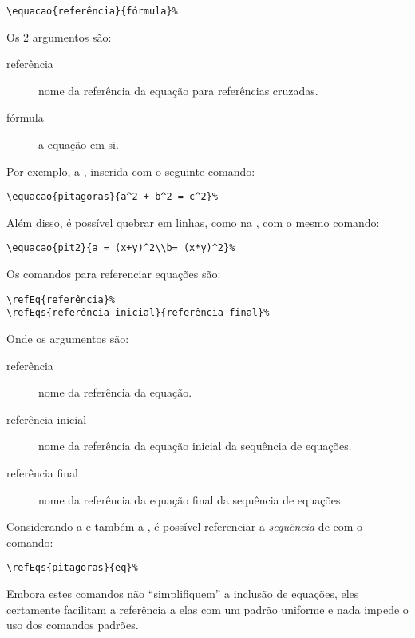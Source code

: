 \begin{verbatim}
\equacao{referência}{fórmula}%
\end{verbatim}

Os 2 argumentos são:
\begin{description}
\item[referência] nome da referência da equação para referências cruzadas.
\item[fórmula] a equação em si.
\end{description}

Por exemplo, a , inserida com o seguinte comando:
\begin{verbatim}
\equacao{pitagoras}{a^2 + b^2 = c^2}%
\end{verbatim}

%

Além disso, é possível quebrar em linhas, como na , com o mesmo comando:
\begin{verbatim}
\equacao{pit2}{a = (x+y)^2\\b= (x*y)^2}%
\end{verbatim}

%

Os comandos para referenciar equações são:

\begin{verbatim}
\refEq{referência}%
\refEqs{referência inicial}{referência final}%
\end{verbatim}

Onde os argumentos são:
\begin{description}
\item[referência] nome da referência da equação.
\item[referência inicial] nome da referência da equação inicial da sequência de equações.
\item[referência final] nome da referência da equação final da sequência de equações.
\end{description}

Considerando a  e também a , é possível referenciar
a \emph{sequência} de  com o comando:
\begin{verbatim}
\refEqs{pitagoras}{eq}%
\end{verbatim}

Embora estes comandos não ``simplifiquem'' a inclusão de equações, eles
certamente facilitam a referência a elas com um padrão uniforme e nada impede o
uso dos comandos padrões.

